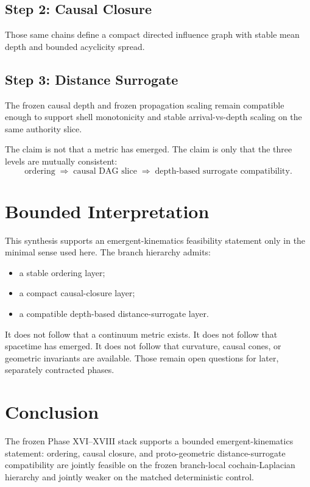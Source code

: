 \documentclass[11pt]{article}
\begin{document}
\subsection*{Step 2: Causal Closure}
Those same chains define a compact directed influence graph with stable mean depth and bounded acyclicity spread.

\subsection*{Step 3: Distance Surrogate}
The frozen causal depth and frozen propagation scaling remain compatible enough to support shell monotonicity and stable arrival-vs-depth scaling on the same authority slice.

The claim is not that a metric has emerged. The claim is only that the three levels are mutually consistent:
\[
\text{ordering}
\;\Rightarrow\;
\text{causal DAG slice}
\;\Rightarrow\;
\text{depth-based surrogate compatibility}.
\]

\section{Bounded Interpretation}

This synthesis supports an emergent-kinematics feasibility statement only in the minimal sense used here. The branch hierarchy admits:
\begin{itemize}
\item a stable ordering layer;
\item a compact causal-closure layer;
\item a compatible depth-based distance-surrogate layer.
\end{itemize}

It does not follow that a continuum metric exists. It does not follow that spacetime has emerged. It does not follow that curvature, causal cones, or geometric invariants are available. Those remain open questions for later, separately contracted phases.

\section{Conclusion}

The frozen Phase XVI--XVIII stack supports a bounded emergent-kinematics statement: ordering, causal closure, and proto-geometric distance-surrogate compatibility are jointly feasible on the frozen branch-local cochain-Laplacian hierarchy and jointly weaker on the matched deterministic control.
\end{document}
